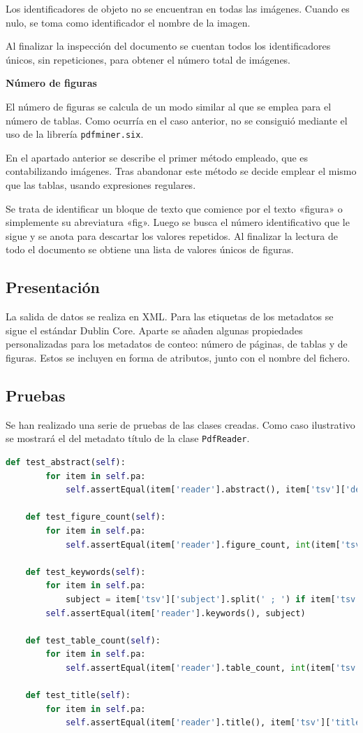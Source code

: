 \documentclass[../main.tex]{subfiles}
\begin{document}
Los identificadores de objeto no se encuentran en todas las imágenes. Cuando es nulo, se toma como identificador el nombre de la imagen.

Al finalizar la inspección del documento se cuentan todos los identificadores únicos, sin repeticiones, para obtener el número total de imágenes.

\textbf{Número de figuras}

El número de figuras se calcula de un modo similar al que se emplea para el número de tablas. Como ocurría en el caso anterior, no se consiguió mediante el uso de la librería \texttt{pdfminer.six}.

En el apartado anterior se describe el primer método empleado, que es contabilizando imágenes. Tras abandonar este método se decide emplear el mismo que las tablas, usando expresiones regulares.

Se trata de identificar un bloque de texto que comience por el texto «figura» o simplemente su abreviatura «fig». Luego se busca el número identificativo que le sigue y se anota para descartar los valores repetidos. Al finalizar la lectura de todo el documento se obtiene una lista de valores únicos de figuras.

\subsection{Presentación}

La salida de datos se realiza en XML. Para las etiquetas de los metadatos se sigue el estándar Dublin Core. Aparte se añaden algunas propiedades personalizadas para los metadatos de conteo: número de páginas, de tablas y de figuras. Estos se incluyen en forma de atributos, junto con el nombre del fichero.

\subsection{Pruebas}

Se han realizado una serie de pruebas de las clases creadas.
Como caso ilustrativo se mostrará el del metadato título de la clase \texttt{PdfReader}.

\begin{lstlisting}[language=Python]
	def test_abstract(self):
	    for item in self.pa:
	        self.assertEqual(item['reader'].abstract(), item['tsv']['description'])
	
	def test_figure_count(self):
	    for item in self.pa:
	        self.assertEqual(item['reader'].figure_count, int(item['tsv']['figures']))
	
	def test_keywords(self):
	    for item in self.pa:
	        subject = item['tsv']['subject'].split(' ; ') if item['tsv']['subject'] else []
	    self.assertEqual(item['reader'].keywords(), subject)
	
	def test_table_count(self):
	    for item in self.pa:
	        self.assertEqual(item['reader'].table_count, int(item['tsv']['tables']))
	
	def test_title(self):
	    for item in self.pa:
	        self.assertEqual(item['reader'].title(), item['tsv']['title'])
\end{lstlisting}
\end{document}
